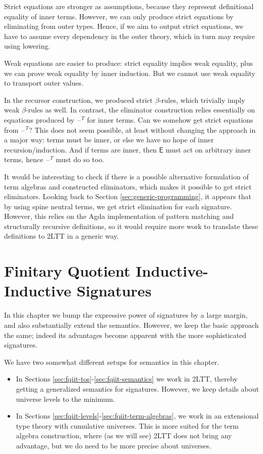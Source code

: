 \documentclass[12pt,a4paper,twoside,openany]{book}
\theoremstyle{remark}
\theoremstyle{definition}
\theoremstyle{theorem}
\newcommand{\ms}[1]{\mathsf{#1}}
\newcommand{\blank}{\mathord{\hspace{1pt}\text{--}\hspace{1pt}}}
\begin{document}
Strict equations are stronger as assumptions, because they represent
definitional equality of inner terms. However, we can only produce strict
equations by eliminating from outer types. Hence, if we aim to output strict
equations, we have to assume every dependency in the outer theory, which in turn
may require using lowering.

Weak equations are easier to produce: strict equality implies weak equality,
plus we can prove weak equality by inner induction. But we cannot use weak
equality to transport outer values.

In the recursor construction, we produced strict $\beta$-rules, which trivially
imply weak $\beta$-rules as well. In contrast, the eliminator construction
relies essentially on equations produced by $\blank^T$ for inner terms. Can we
somehow get strict equations from $\blank^T$? This does not seem possible, at
least without changing the approach in a major way: terms must be inner, or else
we have no hope of inner recursion/induction. And if terms are inner, then
$\ms{E}$ must act on arbitrary inner terms, hence $\blank^T$ must do so too.

It would be interesting to check if there is a possible alternative formulation of
term algebras and constructed eliminators, which makes it possible to get strict
eliminators. Looking back to Section \ref{sec:generic-programming}, it appears
that by using spine neutral terms, we get strict elimination for each
signature. However, this relies on the Agda implementation of pattern matching
and structurally recursive definitions, so it would require more work to translate
these definitions to 2LTT in a generic way.

\chapter[Finitary QII Signatures]{Finitary Quotient Inductive-Inductive Signatures}
\label{chap:fqiit}

In this chapter we bump the expressive power of signatures by a large margin,
and also substantially extend the semantics. However, we keep the basic approach
the same; indeed its advantages become apparent with the more sophisticated
signatures.

We have two somewhat different setups for semantics in this chapter.
\begin{itemize}
  \item In Sections \ref{sec:fqiit-tos}-\ref{sec:fqiit-semantics} we work in 2LTT, thereby
        getting a generalized semantics for signatures. However, we keep details about universe
        levels to the minimum.
  \item In Sections \ref{sec:fqiit-levels}-\ref{sec:fqiit-term-algebras}, we work in an
        extensional type theory with cumulative universes. This is more suited for the term
        algebra construction, where (as we will see) 2LTT does not bring any advantage, but
        we do need to be more precise about universes.
\end{itemize}
\end{document}
